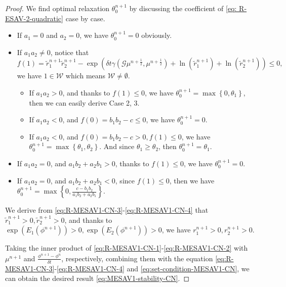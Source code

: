 \documentclass[final,review,onefignum,onetabnum]{siamart190516}
\theoremstyle{plain}
\begin{document}
\begin{proof} 
	We find optimal relaxation $\theta_{0}^{n+1}$ by discussing the coefficient of \eqref{eq: R-ESAV-2-quadratic} case by case. 
\begin{itemize}
  	\item If $a_{1}=0$ and $a_{2}=0$, we have $\theta_{0}^{n+1}=0$ obviously. 
 	\item If $a_{1}a_{2} \neq 0$, notice that 
$$f(1)=\tilde{r}_{1}^{n+1}\tilde{r}_{2}^{n+1}-\exp \left(\delta t \gamma \left(\mathcal{G} \mu^{n+\frac{1}{2}}, \mu^{n+\frac{1}{2}}\right) + \ln(\tilde{r}_{1}^{n+1}) + \ln(\tilde{r}_{2}^{n+1})\right)\leq 0,$$
 we have $1\in \mathcal{W}$ which means $\mathcal{W} \neq \emptyset. $ 
  \begin{itemize}
	\item If $a_1 a_2>0$, and thanks to $f(1)\leq 0$, we have $\theta_{0}^{n+1}=\max \left\{0, \theta_{1}\right\}$, then we can easily derive Case 2, 3. 
	\item If $a_1 a_2 < 0$, and $f(0)=b_1b_2-c \leq 0$, we have $\theta_{0}^{n+1}=0$. 
	\item If $a_1 a_2 < 0$, and $f(0)=b_1b_2-c > 0, f(1) \leq 0$, we have $\theta_{0}^{n+1}=\max\left\{\theta_{1}, \theta_{2}\right\}$. And since $\theta_{1} \geq \theta_{2}$, then $\theta_{0}^{n+1}=\theta_{1}$. 
\end{itemize}
	\item If $a_{1}a_{2}=0$, and $a_1b_2+a_2b_1>0$, thanks to $f(1) \leq 0$, we have $\theta_{0}^{n+1}=0$. \item If $a_{1}a_{2}=0$, and $a_1b_2+a_2b_1<0$, since $f(1) \leq 0$, then we have $\theta_{0}^{n+1}=\max \left\{0, \frac{c-b_1b_2}{a_1b_2+a_2b_1}\right\}$.
\end{itemize}


We derive from \eqref{eq:R-MESAV1-CN-3}-\eqref{eq:R-MESAV1-CN-4} that $\tilde r_{1}^{n+1} > 0, \tilde r_{2}^{n+1} > 0$, and thanks to $\exp\left(E_{1}(\phi^{n+1})\right)>0, \exp\left(E_{2}(\phi^{n+1})\right)>0$, we have $r_{1}^{n+1}>0, r_{2}^{n+1}>0$.

Taking the inner product of \eqref{eq:R-MESAV1-CN-1}-\eqref{eq:R-MESAV1-CN-2} with $\mu^{n+1}$ and $\frac{\phi^{n+1}-\phi^{n}}{\delta t}$, respectively, combining them with the equation \eqref{eq:R-MESAV1-CN-3}-\eqref{eq:R-MESAV1-CN-4} and \eqref{eq:set-condition-MESAV1-CN}, we can obtain the desired result \eqref{eq:MESAV1-stability-CN}. 
\end{proof}
\end{document}

